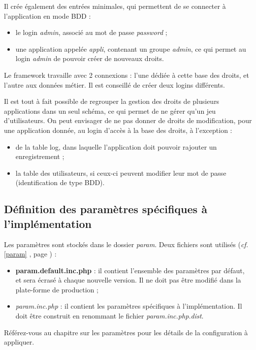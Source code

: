 Il crée également des entrées minimales, qui permettent de se connecter à l'application en mode BDD : 
\begin{itemize}
\item le login \textit{admin}, associé au mot de passe \textit{password} ;
\item une application appelée \textit{appli}, contenant un groupe \textit{admin}, ce qui permet au login \textit{admin} de pouvoir créer de nouveaux droits.
\end{itemize}

Le framework travaille avec 2 connexions : l'une dédiée à cette base des droits, et l'autre aux données métier. Il est conseillé de créer deux logins différents.

Il est tout à fait possible de regrouper la gestion des droits de plusieurs applications dans un seul schéma, ce qui permet de ne gérer qu'un jeu d'utilisateurs. On peut envisager de ne pas donner de droits de modification, pour une application donnée, au login d'accès à la base des droits, à l'exception :
\begin{itemize}
\item de la table log, dans laquelle l'application doit pouvoir rajouter un enregistrement ;
\item la table des utilisateurs, si ceux-ci peuvent modifier leur mot de passe (identification de type BDD).
\end{itemize}

\subsection{Définition des paramètres spécifiques à l'implémentation}

Les paramètres sont stockés dans le dossier \textit{param}. Deux fichiers sont utilisés (\textit{cf.} \ref{param} \textit{}, page \pageref{param}) :
\begin{itemize}
\item \textbf{param.default.inc.php} : il contient l'ensemble des paramètres par défaut, et sera écrasé à chaque nouvelle version. Il ne doit pas être modifié dans la plate-forme de production ;
\item \textit{param.inc.php} : il contient les paramètres spécifiques à l'implémentation. Il doit être construit en renommant le fichier \textit{param.inc.php.dist}.
\end{itemize}

Référez-vous au chapitre sur les paramètres pour les détails de la configuration à appliquer.

